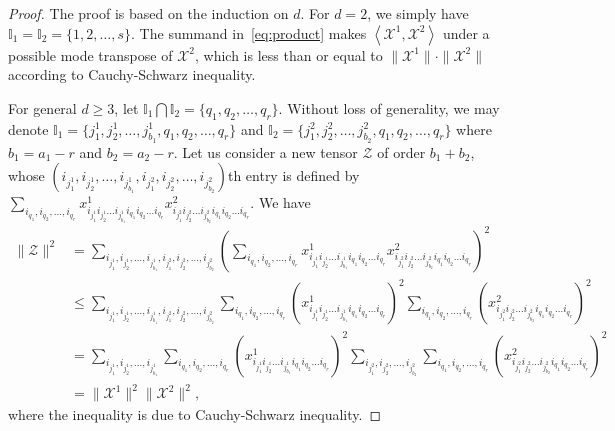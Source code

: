 \documentclass[11pt]{article}
\newcommand{\BI}{\mathbb{I}}
\newcommand{\X}{\mathcal{X}}
\newcommand{\Z}{\mathcal{Z}}
\begin{document}
\begin{proof}
The proof is based on the induction on $d$. For $d=2$, we simply have $\BI_1=\BI_2=\{1,2,\dots,s\}$. The summand in~\eqref{eq:product} makes $\left\langle \X^1,\X^2\right\rangle$ under a possible mode transpose of $\X^2$, which is less than or equal to $\|\X^1\|\cdot\|\X^2\|$ according to Cauchy-Schwarz inequality.

For general $d\ge3$, let $\BI_1\bigcap\BI_2=\{q_1,q_2,\dots,q_r\}$. Without loss of generality, we may denote $\BI_1=\{j^1_1,j^1_2,\dots,j^1_{b_1},q_1,q_2,\dots,q_r\}$ and $\BI_2=\{j^2_1,j^2_2,\dots,j^2_{b_2},q_1,q_2,\dots,q_r\}$ where $b_1=a_1-r$ and $b_2=a_2-r$. Let us consider a new tensor $\Z$ of order $b_1+b_2$, whose $(i_{j^1_1}, i_{j^1_2},\dots,i_{j^1_{b_1}},i_{j^2_1},i_{j^2_2},\dots,i_{j^2_{b_2}})$th entry is defined by
$\sum_{i_{q_1},i_{q_2},\dots,i_{q_r}} x^{1}_{i_{j^1_1} i_{j^1_2} \dots i_{j^1_{b_1}} i_{q_1} i_{q_2} \dots i_{q_r}} x^{2}_{i_{j^2_1} i_{j^2_2} \dots i_{j^2_{b_2}} i_{q_1} i_{q_2} \dots i_{q_r}}$. We have
\begin{align*}
\|\Z\|^2 & = \sum_{i_{j^1_1},i_{j^1_2},\dots,i_{j^1_{b_1}},i_{j^2_1},i_{j^2_2},\dots,i_{j^2_{b_2}}} \left( \sum_{i_{q_1},i_{q_2},\dots,i_{q_r}} x^{1}_{i_{j^1_1} i_{j^1_2}\dots i_{j^1_{b_1}} i_{q_1} i_{q_2} \dots i_{q_r}} x^{2}_{i_{j^2_1} i_{j^2_2} \dots i_{j^2_{b_2}} i_{q_1} i_{q_2} \dots i_{q_r}} \right)^2 \\
&\le \sum_{i_{j^1_1},i_{j^1_2},\dots,i_{j^1_{b_1}},i_{j^2_1},i_{j^2_2},\dots, i_{j^2_{b_2}}}  \sum_{i_{q_1},i_{q_2},\dots,i_{q_r}} \left(x^{1}_{i_{j^1_1} i_{j^1_2}\dots i_{j^1_{b_1}} i_{q_1} i_{q_2} \dots i_{q_r}}\right)^2 \sum_{i_{q_1},i_{q_2},\dots,i_{q_r}} \left(x^{2}_{i_{j^2_1} i_{j^2_2} \dots i_{j^2_{b_2}} i_{q_1} i_{q_2} \dots i_{q_r}} \right)^2  \\
&= \sum_{i_{j^1_1},i_{j^1_2},\dots,i_{j^1_{b_1}}}  \sum_{i_{q_1},i_{q_2},\dots,i_{q_r}} \left(x^{1}_{i_{j^1_1} i_{j^1_2}\dots i_{j^1_{b_1}} i_{q_1} i_{q_2} \dots i_{q_r}}\right)^2 \sum_{i_{j^2_1},i_{j^2_2},\dots, i_{j^2_{b_2}}}  \sum_{i_{q_1},i_{q_2},\dots,i_{q_r}} \left(x^{2}_{i_{j^2_1} i_{j^2_2} \dots i_{j^2_{b_2}} i_{q_1} i_{q_2} \dots i_{q_r}} \right)^2  \\
&=\|\X^1\|^2\|\X^2\|^2,
\end{align*}
where the inequality is due to Cauchy-Schwarz inequality.


\end{proof}
\end{document}
